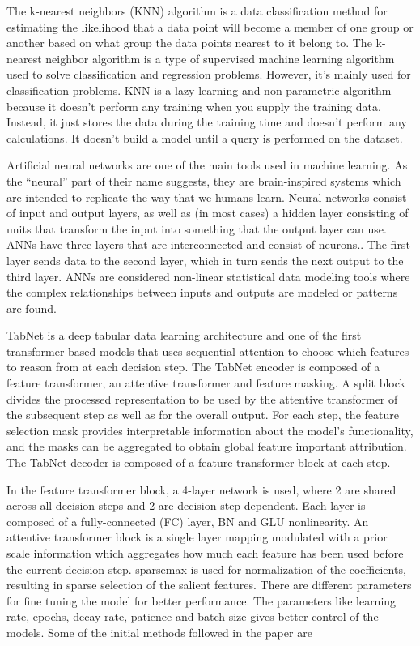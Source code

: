 \documentclass[conference,final,]{IEEEtran}
\begin{document}
The k-nearest neighbors (KNN) algorithm is a data classification method
for estimating the likelihood that a data point will become a member of
one group or another based on what group the data points nearest to it
belong to. The k-nearest neighbor algorithm is a type of supervised
machine learning algorithm used to solve classification and regression
problems. However, it's mainly used for classification problems. KNN is
a lazy learning and non-parametric algorithm because it doesn't perform
any training when you supply the training data. Instead, it just stores
the data during the training time and doesn't perform any calculations.
It doesn't build a model until a query is performed on the dataset.

Artificial neural networks are one of the main tools used in machine
learning. As the ``neural'' part of their name suggests, they are
brain-inspired systems which are intended to replicate the way that we
humans learn. Neural networks consist of input and output layers, as
well as (in most cases) a hidden layer consisting of units that
transform the input into something that the output layer can use. ANNs
have three layers that are interconnected and consist of neurons.. The
first layer sends data to the second layer, which in turn sends the next
output to the third layer. ANNs are considered non-linear statistical
data modeling tools where the complex relationships between inputs and
outputs are modeled or patterns are found.

TabNet is a deep tabular data learning architecture and one of the first
transformer based models that uses sequential attention to choose which
features to reason from at each decision step. The TabNet encoder is
composed of a feature transformer, an attentive transformer and feature
masking. A split block divides the processed representation to be used
by the attentive transformer of the subsequent step as well as for the
overall output. For each step, the feature selection mask provides
interpretable information about the model's functionality, and the masks
can be aggregated to obtain global feature important attribution. The
TabNet decoder is composed of a feature transformer block at each step.

In the feature transformer block, a 4-layer network is used, where 2 are
shared across all decision steps and 2 are decision step-dependent. Each
layer is composed of a fully-connected (FC) layer, BN and GLU
nonlinearity. An attentive transformer block is a single layer mapping
modulated with a prior scale information which aggregates how much each
feature has been used before the current decision step. sparsemax is
used for normalization of the coefficients, resulting in sparse
selection of the salient features. There are different parameters for
fine tuning the model for better performance. The parameters like
learning rate, epochs, decay rate, patience and batch size gives better
control of the models. Some of the initial methods followed in the paper
are
\end{document}
